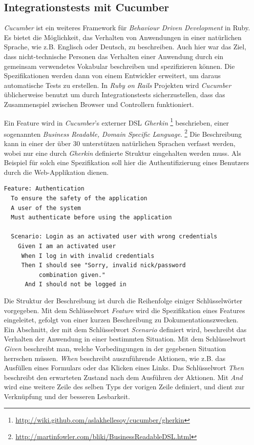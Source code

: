 \subsection{Integrationstests mit Cucumber}
\textit{Cucumber} \cite{cucumber} ist ein weiteres Framework für
\textit{Behaviour Driven Development} in Ruby. Es bietet die
Möglichkeit, das Verhalten von Anwendungen in einer natürlichen
Sprache, wie z.B. Englisch oder Deutsch, zu beschreiben. Auch hier war
das Ziel, dass nicht-technische Personen das Verhalten einer Anwendung
durch ein gemeinsam verwendetes Vokabular beschreiben und
spezifizieren können. Die Spezifikationen werden dann von einem
Entwickler erweitert, um daraus automatische Tests zu erstellen. In
\textit{Ruby on Rails} Projekten wird \textit{Cucumber} üblicherweise benutzt
um durch Integrationstests sicherzustellen, dass das Zusammenspiel
zwischen Browser und Controllern funktioniert.

Ein Feature wird in \textit{Cucumber}'s externer DSL \textit{Gherkin}
\footnote{\url{http://wiki.github.com/aslakhellesoy/cucumber/gherkin}}
beschrieben, einer sogenannten \textit{Business Readable, Domain
  Specific Language}.
\footnote{\url{http://martinfowler.com/bliki/BusinessReadableDSL.html}}
Die Beschreibung kann in einer der über 30 unterstützen natürlichen
Sprachen verfasst werden, wobei nur eine durch \textit{Gherkin}
definierte Struktur eingehalten werden muss. Als Beispiel für solch
eine Spezifikation soll hier die Authentifizierung eines Benutzers
durch die Web-Applikation dienen.

\begin{lstlisting}[caption=Spezifikation eines Features mit \textit{Cucumber}]
Feature: Authentication
  To ensure the safety of the application
  A user of the system
  Must authenticate before using the application

  Scenario: Login as an activated user with wrong credentials
    Given I am an activated user
     When I log in with invalid credentials
     Then I should see "Sorry, invalid nick/password
          combination given."
      And I should not be logged in
\end{lstlisting}

Die Struktur der Beschreibung ist durch die Reihenfolge einiger
Schlüssel\-wörter vorgegeben. Mit dem Schlüsselwort \textit{Feature}
wird die Spezifikation eines Features eingeleitet, gefolgt von einer
kurzen Beschreibung zu Dokumentationszwecken. Ein Abschnitt, der mit
dem Schlüsselwort \textit{Scenario} definiert wird, beschreibt das
Verhalten der Anwendung in einer bestimmten Situation. Mit dem
Schlüsselwort \textit{Given} beschreibt man, welche Vorbedingungen in
der gegebenen Situation herrschen müssen. \textit{When} beschreibt
auszuführende Aktionen, wie z.B. das Ausfüllen eines Formulars oder
das Klicken eines Links. Das Schlüsselwort \textit{Then} beschreibt
den erwarteten Zustand nach dem Ausführen der Aktionen. Mit
\textit{And} wird eine weitere Zeile des selben Typs der vorigen Zeile
definiert, und dient zur Verknüpfung und der besseren Lesbarkeit.

